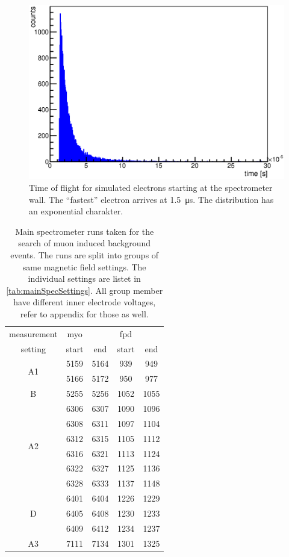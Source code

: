   \begin{figure}
	\centerline{\includegraphics[width = 1.1\textwidth]{graphics/simulation/muonTimeMainSpec.eps}}
	\caption[Main spectrometer simulation]{Time of flight for simulated electrons starting at the spectrometer wall. The ``fastest'' electron arrives at \SI{1.5}{\micro\second}. The distribution has an exponential charakter.}
  	\label{fig:mainSpecSimulation}
  \end{figure}


\begin{table}
	\centering
	\begin{tabular}{|c|cc|cc|}
		\hline
		measurement & myo & & fpd & \\
		setting& start & end & start & end\\
		\hline
		\multirow{2}{*}{A1} & 5159 & 5164 & 939 & 949 \\
		 & 5166 & 5172 & 950 & 977\\
		\hline
		\multirow{1}{*}{B} &5255 & 5256 & 1052 & 1055\\
		\hline
		\multirow{6}{*}{A2}& 6306 & 6307 & 1090 & 1096\\
		& 6308 & 6311 & 1097 & 1104\\
		& 6312 & 6315 & 1105 & 1112\\
		& 6316 & 6321 & 1113 & 1124\\
		& 6322 & 6327 & 1125 & 1136\\
		& 6328 & 6333 & 1137 & 1148\\
		\hline
		
		\multirow{3}{*}{D}& 6401 & 6404 & 1226 & 1229\\
		& 6405 & 6408 & 1230 & 1233\\
		& 6409 & 6412 & 1234 & 1237\\
		\hline
		
		
		
		A3& 7111 & 7134 & 1301 & 1325\\
		\hline
	\end{tabular}
	\caption[Main spectrometer runs]{Main spectrometer runs taken for the search of muon induced background events. The runs are split into groups of same magnetic field settings. The individual settings are listet in \ref{tab:mainSpecSettings}. All group member have different inner electrode voltages, refer to appendix for those as well.}
	\label{tab:mainSpecRuns}
\end{table}

